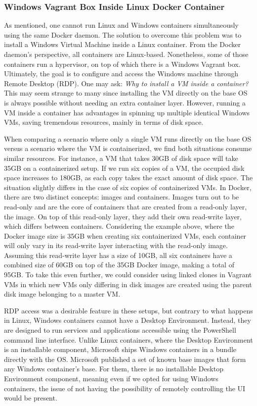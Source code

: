 \subsubsection{Windows Vagrant Box Inside Linux Docker Container} \label{sec:validation_windows_vagrant_inside_linux_docker}

As mentioned, one cannot run Linux and Windows containers simultaneously using the same Docker daemon. The solution to overcome this problem was to install a Windows Virtual Machine inside a Linux container. From the Docker daemon's perspective, all containers are Linux-based. Nonetheless, some of those containers run a hypervisor, on top of which there is a Windows Vagrant box. Ultimately, the goal is to configure and access the Windows machine through Remote Desktop (RDP). One may ask: \textit{Why to install a VM inside a container?} This may seem strange to many since installing the VM directly on the base OS is always possible without needing an extra container layer. However, running a VM inside a container has advantages in spinning up multiple identical Windows VMs, saving tremendous resources, mainly in terms of disk space.

When comparing a scenario where only a single VM runs directly on the base OS versus a scenario where the VM is containerized, we find both situations consume similar resources. For instance, a VM that takes 30GB of disk space will take 35GB on a containerized setup. If we run six copies of a VM, the occupied disk space increases to 180GB, as each copy takes the exact amount of disk space. The situation slightly differs in the case of six copies of containerized VMs. In Docker, there are two distinct concepts: images and containers. Images turn out to be read-only and are the core of containers that are created from a read-only layer, the image. On top of this read-only layer, they add their own read-write layer, which differs between containers. Considering the example above, where the Docker image size is 35GB when creating six containerized VMs, each container will only vary in its read-write layer interacting with the read-only image. Assuming this read-write layer has a size of 10GB, all six containers have a combined size of 60GB on top of the 35GB Docker image, making a total of 95GB. To take this even further, we could consider using linked clones in Vagrant VMs in which new VMs only differing in disk images are created using the parent disk image belonging to a master VM.

RDP access was a desirable feature in these setups, but contrary to what happens in Linux,  Windows containers cannot have a Desktop Environment. Instead, they are designed to run services and applications accessible using the PowerShell command line interface. Unlike Linux containers, where the Desktop Environment is an installable component, Microsoft ships Windows containers in a bundle directly with the OS. Microsoft published a set of known base images that form any Windows container's base. For them, there is no installable Desktop Environment component, meaning even if we opted for using Windows containers, the issue of not having the possibility of remotely controlling the UI would be present.

